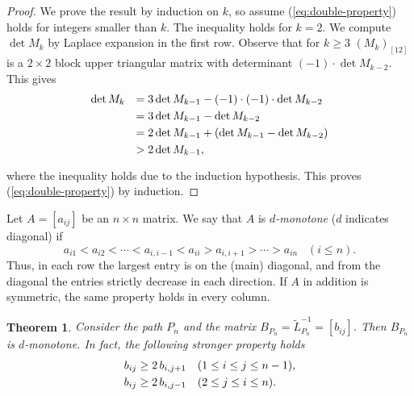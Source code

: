 \documentclass[12pt]{article}
\newtheorem{theorem}{Theorem}[section]
\begin{document}
%
\begin{proof}
  We prove the result by induction on $k$, so assume (\ref{eq:double-property}) holds for integers smaller than $k$. The inequality holds for $k=2$. We compute $\det M_k$ by Laplace expansion  in the first row. Observe that for $k \ge 3$ $(M_k)_{[12]}$ is a $2 \times 2$ block upper triangular matrix with determinant 
  $(-1)\cdot \det M_{k-2}$. This gives
 \[
  \begin{array}{ll} \vspace{0.1cm}
    \det M_k &=3\det M_{k-1} - (-1) \cdot (-1) \cdot \det M_{k-2} \\ \vspace{0.1cm}
              &=3\det M_{k-1} -  \det M_{k-2}  \\ \vspace{0.1cm}
              &=2\det M_{k-1}+(\det M_{k-1}-  \det M_{k-2}) \\ \vspace{0.1cm}
              &>2\det M_{k-1},
  \end{array}  
 \]
 where the inequality holds due to  the induction hypothesis. This proves (\ref{eq:double-property}) by induction.
\end{proof}

\medskip
Let $A=[a_{ij}]$ be an $n \times n$ matrix. We say that $A$ is {\em $d$-monotone} ($d$ indicates diagonal) if 
%
\[
     a_{i1}< a_{i2}<\cdots <a_{i,i-1} < a_{ii} > a_{i,i+1} > \cdots > a_{in} \;\;\;(i \le n).
\]
%
Thus, in each row the largest entry is on the (main) diagonal, and from the diagonal the entries strictly decrease in each direction. If $A$ in addition is symmetric, the same property holds in every column. 

\begin{theorem}
 \label{thm:B_monotone}
  Consider the path $P_n$ and the matrix 
  $B_{P_n}=\tilde{L}_{P_n}^{-1}=[b_{ij}]$. 
 Then $B_{P_n}$ is $d$-monotone. In fact,  the following stronger property holds 
 \begin{equation}
 \label{eq:d-mon-extra}
 \begin{array}{cl} \vspace{0.1cm}
     b_{ij} \ge 2 \,b_{i,j+1}   &(1\le i\le j \le n-1), \\ \vspace{0.1cm}
     b_{ij} \ge 2 \,b_{i,j-1}    &(2\le j\le i \le n).
 \end{array}    
 \end{equation}
\end{theorem}
\end{document}
